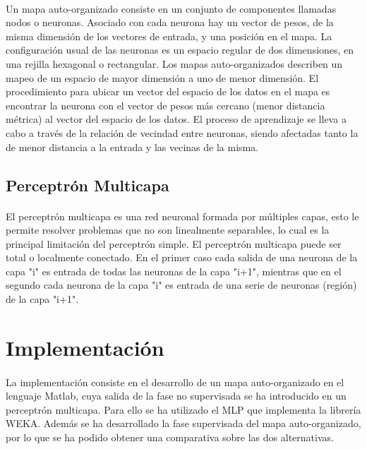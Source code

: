 \documentclass[10pt, a4paper,spanish]{article}
\begin{document}
			\paragraph{}
			Un mapa auto-organizado consiste en un conjunto de componentes llamadas nodos o neuronas. Asociado con cada neurona hay un vector de pesos, de la misma dimensión de los vectores de entrada, y una posición en el mapa. La configuración usual de las neuronas es un espacio regular de dos dimensiones, en una rejilla hexagonal o rectangular. Los mapas auto-organizados describen un mapeo de un espacio de mayor dimensión a uno de menor dimensión. El procedimiento para ubicar un vector del espacio de los datos en el mapa es encontrar la neurona con el vector de pesos más cercano (menor distancia métrica) al vector del espacio de los datos. El proceso de aprendizaje se lleva a cabo a través de la relación de vecindad entre neuronas, siendo afectadas tanto la de menor distancia a la entrada y las vecinas de la misma.


		\subsection{Perceptrón Multicapa}

			\paragraph{}
			El perceptrón multicapa es una red neuronal formada por múltiples capas, esto le permite resolver problemas que no son linealmente separables, lo cual es la principal limitación del perceptrón simple. El perceptrón multicapa puede ser total o localmente conectado. En el primer caso cada salida de una neurona de la capa "i" es entrada de todas las neuronas de la capa "i+1", mientras que en el segundo cada neurona de la capa "i" es entrada de una serie de neuronas (región) de la capa "i+1".

	\clearpage
	\section{Implementación}

		\paragraph{}
		La implementación consiste en el desarrollo de un mapa auto-organizado en el lenguaje Matlab, cuya salida de la fase no supervisada se ha introducido en un perceptrón multicapa. Para ello se ha utilizado el MLP que implementa la librería WEKA. Además se ha desarrollado la fase supervisada del mapa auto-organizado, por lo que se ha podido obtener una comparativa sobre las dos alternativas.
\end{document}
